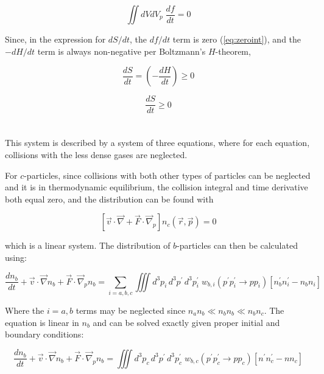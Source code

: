 \documentclass{template}
\begin{document}
\begin{equation}\label{eq:zeroint}
    \iint dVdV_p \; \frac{df}{dt} = 0
\end{equation}

Since, in the expression for $dS/dt$, the $df/dt$ term is zero (\autoref{eq:zeroint}), and the $-dH/dt$ term is always non-negative per Boltzmann's $H$-theorem,

\begin{equation}
    \frac{dS}{dt} =\left(  - \frac{dH}{dt} \right)\geq 0
\end{equation}

\begin{equation}
    \boxed{\frac{dS}{dt} \geq 0}
\end{equation}

\section{}

This system is described by a system of three equations, where for each equation, collisions with the less dense gases are neglected.

For $c$-particles, since collisions with both other types of particles can be neglected and it is in thermodynamic equilibrium, the collision integral and time derivative both equal zero, and the distribution can be found with

\begin{equation}
    \boxed{\left[ \vec{v}\cdot\vec{\nabla} + \vec{F}\cdot\vec{\nabla}_p \right] n_c(\vec{r}, \vec{p}) = 0}
\end{equation}

which is a linear system. The distribution of $b$-particles can then be calculated using:

\begin{equation}
    \frac{dn_b}{dt} + \vec{v}\cdot\vec{\nabla}n_b + \vec{F}\cdot\vec{\nabla}_p n_b = \sum_{i=a,b,c} \iiint d^3p_i\, d^3p^\prime \, d^3p_i^\prime \; w_{b,i}(p^\prime p_i^\prime \rightarrow pp_i )\left[    n_b^\prime n_i^\prime - n_bn_i\right]
\end{equation}

Where the $i=a,b$ terms may be neglected since $n_an_b \ll n_bn_b\ll n_bn_c$. The equation is linear in $n_b$ and can be solved exactly given proper initial and boundary conditions:

\begin{equation}\label{eq:b-particles}
\boxed{    \frac{dn_b}{dt} + \vec{v}\cdot\vec{\nabla}n_b + \vec{F}\cdot\vec{\nabla}_p n_b = \iiint d^3p_c\, d^3p^\prime \, d^3p_c^\prime \; w_{b,c}(p^\prime p_c^\prime \rightarrow pp_c )\left[    n^\prime n_c^\prime - nn_c\right]}
\end{equation}
\end{document}
